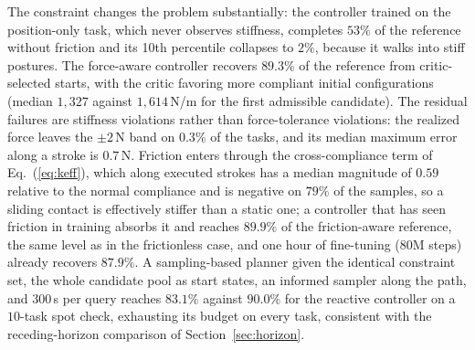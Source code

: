 \documentclass[journal, twoside]{IEEEtran}
\begin{document}
The constraint changes the problem substantially: the controller trained
on the position-only task, which never observes stiffness, completes
$53\%$ of the reference without friction and its 10th percentile
collapses to $2\%$, because it walks into stiff postures. The
force-aware controller recovers $89.3\%$ of the reference from
critic-selected starts, with the critic favoring more compliant initial
configurations (median $1{,}327$ against $1{,}614$\,N/m for the first
admissible candidate). The residual failures are stiffness violations
rather than force-tolerance violations: the realized force leaves the
$\pm2$\,N band on $0.3\%$ of the tasks, and its median maximum error
along a stroke is $0.7$\,N. Friction enters through the
cross-compliance term of Eq.~(\ref{eq:keff}), which along executed
strokes has a median magnitude of $0.59$ relative to the normal
compliance and is negative on $79\%$ of the samples, so a sliding contact
is effectively stiffer than a static one; a controller that has seen
friction in training absorbs it and reaches $89.9\%$ of the
friction-aware reference, the same level as in the frictionless case,
and one hour of fine-tuning ($80$M steps) already recovers $87.9\%$.
A sampling-based planner given the identical constraint set, the whole
candidate pool as start states, an informed sampler along the path, and
$300$\,s per query reaches $83.1\%$ against $90.0\%$ for the reactive
controller on a $10$-task spot check, exhausting its budget on every
task, consistent with the receding-horizon comparison of
Section~\ref{sec:horizon}.
\end{document}
